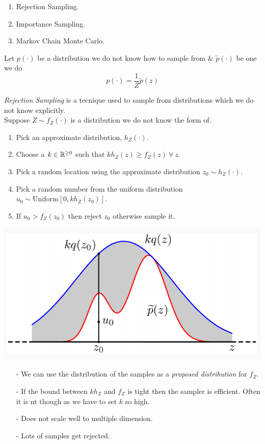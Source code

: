 \documentclass[11pt,a4paper]{article}
\begin{document}
\begin{enumerate}[label=\roman*)]
	\item Rejection Sampling.
	\item Importance Sampling.
	\item Markov Chain Monte Carlo.
\end{enumerate}

\remark{}
Let $p(\cdot)$ be a distribution we do not know how to sample from \& $\tilde{p}(\cdot)$ be one we do
$$p(\cdot)=\frac{1}{Z}\tilde{p}(z)$$

\textit{Rejection Sampling} is a tecnique used to sample from distributions which we do not know explicitly.\\
Suppose $Z\sim f_Z(\cdot)$ is a distribution we do not know the form of.
\begin{enumerate}
	\item Pick an approximate distribution, $h_Z(\cdot)$.
	\item Choose a $k\in\mathbb{R}^{\geq0}$ such that $kh_Z(z)\geq f_Z(z)\ \forall\ z$.
	\item Pick a random location using the approximate distribution $z_0\sim h_Z(\cdot)$.
	\item Pick a random number from the uniform distribution $u_0\sim\text{Uniform}[0,kh_Z(z_0)]$.
	\item If $u_0>f_Z(z_0)$ then reject $z_0$ otherwise sample it.
\end{enumerate}
\includegraphics[scale=.4]{img/rejectionSampling.png}

\begin{itemize}
	\item[-] We can use the distribution of the samples as a \textit{proposed distribution} for $f_Z$.
	\item[-] If the bound between $kh_Z$ and $f_Z$ is tight then the sampler is efficient. Often it is nt though as we have to set $k$ so high.
	\item[-] Does not scale well to multiple dimension.
	\item[-] Lots of samples get rejected.
\end{itemize}
\end{document}
